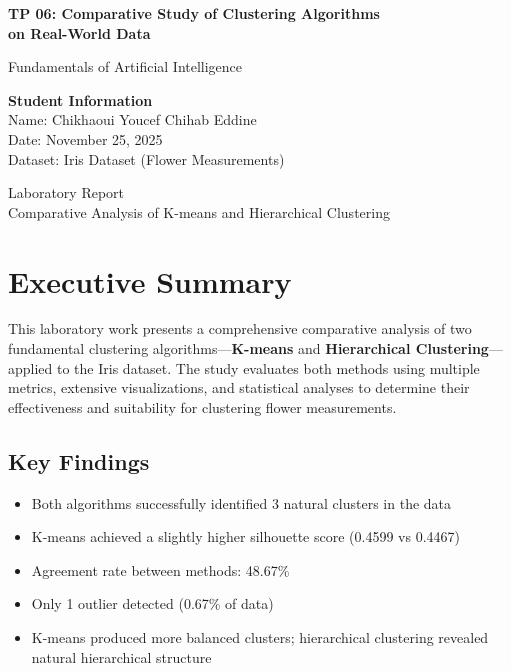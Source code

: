 \documentclass[12pt,a4paper]{article}
\begin{document}
\begin{titlepage}
    \centering
    \vspace*{2cm}
    
    {\Huge\bfseries TP 06: Comparative Study of Clustering Algorithms\\[0.5cm]}
    {\huge\bfseries on Real-World Data\\[2cm]}
    
    {\Large Fundamentals of Artificial Intelligence\\[1.5cm]}
    
    {\Large\bfseries Student Information\\[0.5cm]}
    {\large Name: Chikhaoui Youcef Chihab Eddine\\[0.3cm]}
    {\large Date: November 25, 2025\\[0.3cm]}
    {\large Dataset: Iris Dataset (Flower Measurements)\\[3cm]}
    
    \vfill
    
    {\large Laboratory Report\\
    Comparative Analysis of K-means and Hierarchical Clustering}
    
\end{titlepage}

\tableofcontents
\newpage

\section{Executive Summary}

This laboratory work presents a comprehensive comparative analysis of two fundamental clustering algorithms—\textbf{K-means} and \textbf{Hierarchical Clustering}—applied to the Iris dataset. The study evaluates both methods using multiple metrics, extensive visualizations, and statistical analyses to determine their effectiveness and suitability for clustering flower measurements.

\subsection{Key Findings}

\begin{itemize}[leftmargin=*]
    \item Both algorithms successfully identified 3 natural clusters in the data
    \item K-means achieved a slightly higher silhouette score (0.4599 vs 0.4467)
    \item Agreement rate between methods: 48.67\%
    \item Only 1 outlier detected (0.67\% of data)
    \item K-means produced more balanced clusters; hierarchical clustering revealed natural hierarchical structure
\end{itemize}
\end{document}
